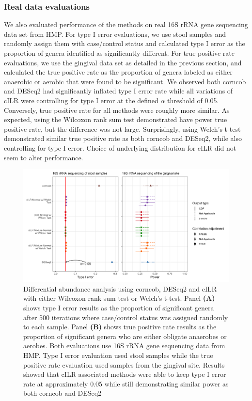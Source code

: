 \documentclass[10pt,letterpaper]{article}
\begin{document}
\subsubsection*{Real data evaluations}
We also evaluated performance of the methods on real 16S rRNA gene sequencing data set from HMP. For type I error evaluations, we use stool samples and randomly assign them with case/control status and calculated type I error as the proportion of genera identified as significantly different. For true positive rate evaluations, we use the gingival data set as detailed in the previous section, and calculated the true positive rate as the proportion of genera labeled as either anaerobic or aerobic that were found to be significant.   
We observed both corncob and DESeq2 had significantly inflated type I error rate while all variations of cILR were controlling for type I error at the defined $\alpha$ threshold of 0.05. Conversely, true positive rate for all methods were roughly more similar. As expected, using the Wilcoxon rank sum test demonstrated have power true positive rate, but the difference was not large. Surprisingly, using Welch's t-test demonstrated similar true positive rate as both corncob and DESeq2, while also controlling for type I error. Choice of underlying distribution for cILR did not seem to alter performance. 

\begin{figure}[!ht]
    \centering
    \includegraphics[width = \textwidth]{figures/data_diff_ab.png}
    \caption{Differential abundance analysis using corncob, DESeq2 and cILR with either Wilcoxon rank sum test or Welch's t-test. Panel \textbf{(A)} shows type I error results as the proportion of significant genera after 500 iterations where case/control status was assigned randomly to each sample. Panel \textbf{(B)} shows true positive rate results as the proportion of significant genera who are either obligate anaerobes or aerobes. Both evaluations use 16S rRNA gene sequencing data from HMP. Type I error evaluation used stool samples while the true positive rate evaluation used samples from the gingival site. Results showed that cILR associated methods were able to keep type I error rate at approximately 0.05 while still demonstrating similar power as both corncob and DESeq2} 
    \label{fig:4}
\end{figure}
\end{document}
